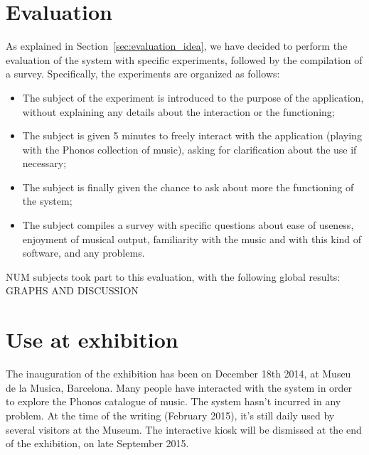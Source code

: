 \section{Evaluation}
\label{sec:eval_results}
As explained in Section~\ref{sec:evaluation_idea}, we have decided to perform the evaluation of the system with specific experiments, followed by the compilation of a survey.
Specifically, the experiments are organized as follows:
\begin{itemize}
\item The subject of the experiment is introduced to the purpose of the application, without explaining any details about the interaction or the functioning;
\item The subject is given 5 minutes to freely interact with the application (playing with the Phonos collection of music), asking for clarification about the use if necessary;
\item The subject is finally given the chance to ask about more the functioning of the system;
\item The subject compiles a survey with specific questions about ease of useness, enjoyment of musical output, familiarity with the music and with this kind of software, and any problems. 
\end{itemize}

NUM subjects took part to this evaluation, with the following global results: \\
GRAPHS AND DISCUSSION

\section{Use at exhibition} 
The inauguration of the exhibition has been on December 18th 2014, at Museu de la Musica, Barcelona. Many people have interacted with the system in order to explore the Phonos catalogue of music. The system hasn't incurred in any problem. At the time of the writing (February 2015), it's still daily used by several visitors at the Museum. The interactive kiosk will be dismissed at the end of the exhibition, on late September 2015.\\

